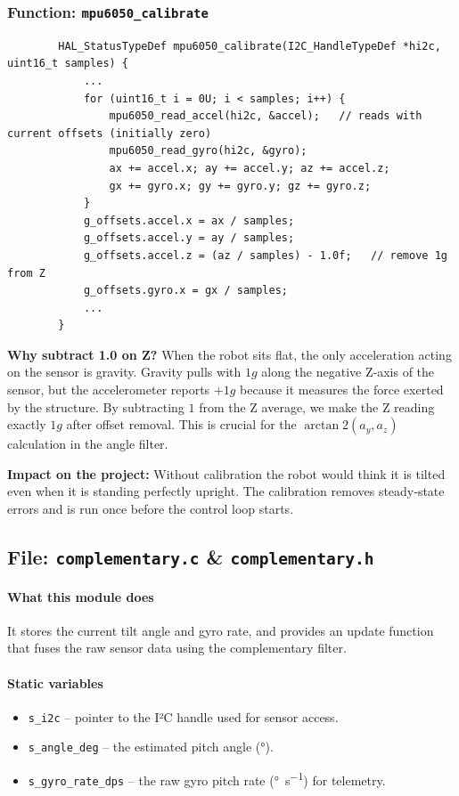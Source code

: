 \documentclass[12pt,a4paper]{article}
\newcommand{\file}[1]{\texttt{#1}}
\newcommand{\func}[1]{\texttt{#1}}
\begin{document}
	\subsubsection*{Function: \func{mpu6050\_calibrate}}
	\begin{lstlisting}
		HAL_StatusTypeDef mpu6050_calibrate(I2C_HandleTypeDef *hi2c, uint16_t samples) {
			...
			for (uint16_t i = 0U; i < samples; i++) {
				mpu6050_read_accel(hi2c, &accel);   // reads with current offsets (initially zero)
				mpu6050_read_gyro(hi2c, &gyro);
				ax += accel.x; ay += accel.y; az += accel.z;
				gx += gyro.x; gy += gyro.y; gz += gyro.z;
			}
			g_offsets.accel.x = ax / samples;
			g_offsets.accel.y = ay / samples;
			g_offsets.accel.z = (az / samples) - 1.0f;   // remove 1g from Z
			g_offsets.gyro.x = gx / samples;
			...
		}
	\end{lstlisting}
	\textbf{Why subtract 1.0 on Z?}  
	When the robot sits flat, the only acceleration acting on the sensor is gravity. Gravity pulls with \(1g\) along the negative Z‑axis of the sensor, but the accelerometer reports \(+1g\) because it measures the force exerted by the structure. By subtracting \(1\) from the Z average, we make the Z reading exactly \(1g\) after offset removal. This is crucial for the \(\arctan2(a_y, a_z)\) calculation in the angle filter.
	
	\noindent\textbf{Impact on the project:}  
	Without calibration the robot would think it is tilted even when it is standing perfectly upright. The calibration removes steady‑state errors and is run once before the control loop starts.
	
	\subsection{File: \file{complementary.c} \& \file{complementary.h}}
	\label{subsec:complementary}
	\paragraph*{What this module does}
	It stores the current tilt angle and gyro rate, and provides an update function that fuses the raw sensor data using the complementary filter.
	
	\paragraph*{Static variables}
	\begin{itemize}
		\item \texttt{s\_i2c} -- pointer to the I²C handle used for sensor access.
		\item \texttt{s\_angle\_deg} -- the estimated pitch angle (\si{\degree}).
		\item \texttt{s\_gyro\_rate\_dps} -- the raw gyro pitch rate (\si{\degree\per\second}) for telemetry.
	\end{itemize}
	
\end{document}
